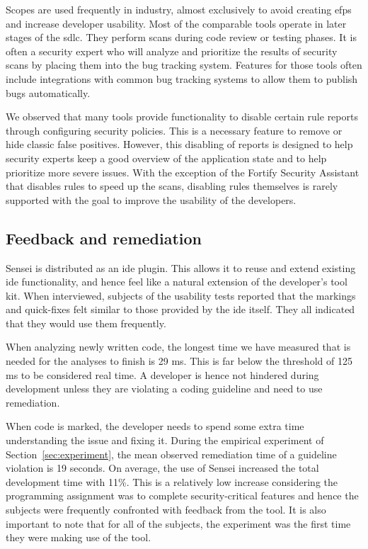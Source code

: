 Scopes are used frequently in industry, almost exclusively to avoid creating \glspl{efp} and increase developer usability.
Most of the comparable tools operate in later stages of the \gls{sdlc}.
They perform scans during code review or testing phases.
It is often a security expert who will analyze and prioritize the results of security scans by placing them into the bug tracking system.
Features for those tools often include integrations with common bug tracking systems to allow them to publish bugs automatically.

We observed that many tools provide functionality to disable certain rule reports through configuring security policies.
This is a necessary feature to remove or hide classic false positives.
However, this disabling of reports is designed to help security experts keep a good overview of the application state and to help prioritize more severe issues.
With the exception of the Fortify Security Assistant that disables rules to speed up the scans, disabling rules themselves is rarely supported with the goal to improve the usability of the developers.

\subsection{Feedback and remediation}
Sensei is distributed as an \gls{ide} plugin.
This allows it to reuse and extend existing \gls{ide} functionality, and hence feel like a natural extension of the developer's tool kit.
When interviewed, subjects of the usability tests reported that the markings and quick-fixes felt similar to those provided by the \gls{ide} itself.
They all indicated that they would use them frequently.

When analyzing newly written code, the longest time we have measured that is needed for the analyses to finish is 29 ms.
This is far below the threshold of 125 ms to be considered real time.
A developer is hence not hindered during development unless they are violating a coding guideline and need to use remediation.

When code is marked, the developer needs to spend some extra time understanding the issue and fixing it.
During the empirical experiment of Section~\ref{sec:experiment}, the mean observed remediation time of a guideline violation is 19 seconds.
On average, the use of Sensei increased the total development time with 11\%.
This is a relatively low increase considering the programming assignment was to complete security-critical features and hence the subjects were frequently confronted with feedback from the tool.
It is also important to note that for all of the subjects, the experiment was the first time they were making use of the tool.

